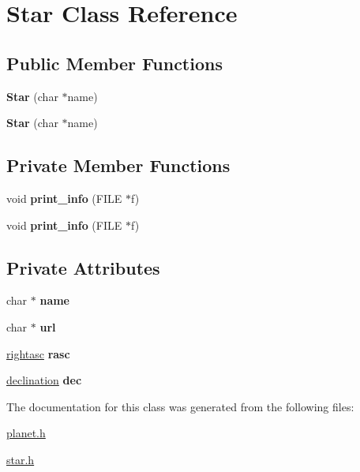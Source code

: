 \hypertarget{classStar}{}\section{Star Class Reference}
\label{classStar}
\subsection*{Public Member Functions}
\begin{DoxyCompactItemize}
\item 
\mbox{\label{classStar_a1712fd01e625cd2dbfaafff2d8437b21}} 
{\bfseries Star} (char $\ast$name)
\item 
\mbox{\label{classStar_a1712fd01e625cd2dbfaafff2d8437b21}} 
{\bfseries Star} (char $\ast$name)
\end{DoxyCompactItemize}
\subsection*{Private Member Functions}
\begin{DoxyCompactItemize}
\item 
\mbox{\label{classStar_a3b9e8ce1438ed9b2a6ad2850c701b08b}} 
void {\bfseries print\+\_\+info} (F\+I\+LE $\ast$f)
\item 
\mbox{\label{classStar_a3b9e8ce1438ed9b2a6ad2850c701b08b}} 
void {\bfseries print\+\_\+info} (F\+I\+LE $\ast$f)
\end{DoxyCompactItemize}
\subsection*{Private Attributes}
\begin{DoxyCompactItemize}
\item 
\mbox{\label{classStar_a4fe6503beb1138b37d55a8b6168601c4}} 
char $\ast$ {\bfseries name}
\item 
\mbox{\label{classStar_a4c0a0ee8088104c97733e324b0bc29d1}} 
char $\ast$ {\bfseries url}
\item 
\mbox{\label{classStar_a751fe6749069cf956231e60b663ae8ef}} 
\mbox{\hyperlink{structrightasc}{rightasc}} {\bfseries rasc}
\item 
\mbox{\label{classStar_aaf45e319ec0f6f747836e74d0f06e407}} 
\mbox{\hyperlink{structdeclination}{declination}} {\bfseries dec}
\end{DoxyCompactItemize}


The documentation for this class was generated from the following files\+:\begin{DoxyCompactItemize}
\item 
\mbox{\hyperlink{planet_8h}{planet.\+h}}\item 
\mbox{\hyperlink{star_8h}{star.\+h}}\end{DoxyCompactItemize}
